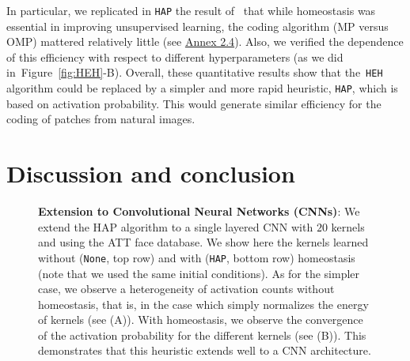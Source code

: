 \documentclass[vision,article,submit,oneauthor,pdftex]{Definitions/mdpi}
\newcommand{\seeFig}[1]{Figure~\ref{fig:#1}}%
\begin{document}
In particular, we replicated in \texttt{HAP} the result of~\cite{Sandin17} that while homeostasis was essential in improving unsupervised learning, the coding algorithm (MP versus OMP) mattered relatively little (see \href{https://spikeai.github.io/HULK/#Testing-different-algorithms}{Annex 2.4}). Also, we verified the dependence of this efficiency with respect to different hyperparameters (as we did in~\seeFig{HEH}-B). %
Overall, these quantitative results show that the~\texttt{HEH} algorithm could be replaced by a simpler and more rapid heuristic, \texttt{HAP}, which is based on activation probability. This would generate similar efficiency for the coding of patches from natural images.
\section{Discussion and conclusion}\label{discussion-et-conclusion}
\begin{figure}%
\caption{
{\bf Extension to Convolutional Neural Networks (CNNs)}: %
 We extend the HAP algorithm to a single layered CNN with $20$ kernels and using the ATT face database. We show here the kernels learned without (\texttt{None}, top row) and with (\texttt{HAP}, bottom row) homeostasis (note that we used the same initial conditions). As for the simpler case, we observe a heterogeneity of activation counts without homeostasis, that is, in the case which simply normalizes the energy of kernels (see {\sf (A)}). With homeostasis, we observe the convergence of the activation probability for the different kernels (see {\sf (B)}). This demonstrates that this heuristic extends well to a CNN architecture.
\label{fig:CNN}}%
\end{figure}%
\end{document}
